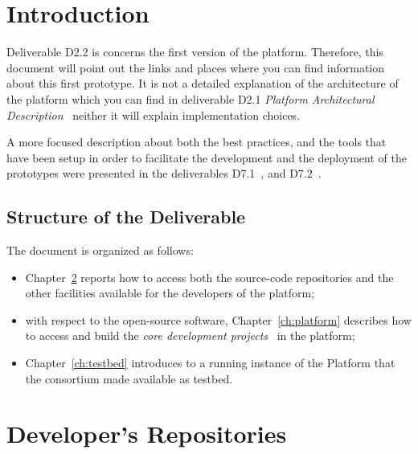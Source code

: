 \documentclass{learnpad}
\begin{document}
\mainmatter


\chapter{Introduction}
\label{ch:intro}

Deliverable D2.2 is concerns the first version of the \learnpad platform.
Therefore, this document will point out the links and places where you can find
information about this first prototype.  It is not a detailed explanation of the
architecture of the platform which you can find in deliverable D2.1
\emph{Platform Architectural Description}~\cite{learnpad:D2.1} neither it will 
explain implementation choices.

A more focused description about both the best practices, and the tools 
that have been setup in order to facilitate the development and the deployment 
of the \learnpad prototypes were presented in the deliverables 
D7.1~\cite{learnpad:D7.1}, and D7.2~\cite{learnpad:D7.2}.

\section{Structure of the Deliverable}
\label{sec:structure}

The document is organized as follows:
\begin{itemize}
 \item Chapter~\ref{ch:sourcecode} reports how to access both the 
source-code repositories and the other facilities available for the developers 
of the \learnpad platform;
 \item with respect to the open-source software, Chapter~\ref{ch:platform} 
describes how to access and build the \textit{core development 
projects}~\cite{learnpad:D7.1} in the platform;
 \item Chapter~\ref{ch:testbed} introduces to a running instance of the 
\learnpad Platform that the consortium made available as testbed.
\end{itemize}

\chapter{Developer's Repositories}
\label{ch:sourcecode}
\end{document}
